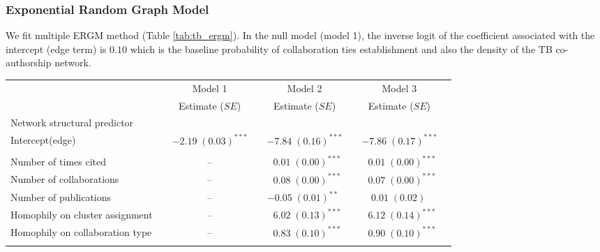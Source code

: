 \subsubsection{Exponential Random Graph Model}
\label{sec:tb_results_ergm}
We fit multiple ERGM method (Table \ref{tab:tb_ergm}). In the null model (model 1), the inverse logit of the coefficient associated with the intercept (edge term) is $0.10$ which is the baseline probability of collaboration ties establishment and also the density of the TB co-authorship network.

\begin{table}
\begin{center}
\hspace*{-1cm}
\small
\begin{tabular}{@{}lcclclcl@{}}
\toprule
           &  & Model 1 &  & Model 2  &  & Model 3\\ \cmidrule{3-3} \cmidrule{5-5} \cmidrule{7-7}            &  & Estimate ($SE$) &  & Estimate ($SE$)  &  & Estimate ($SE$) \\ \midrule
           Network structural predictor &  &   &  &  &  \\
\hspace{10pt}Intercept(edge) & & $-2.19 \; (0.03)^{***}$ & & $-7.84 \; (0.16)^{***}$ & & $-7.86 \; (0.17)^{***}$ \\ \\
Number of times cited        & &       --  & & $\hspace{6pt}0.01 \; (0.00)^{***}$ &  & $\hspace{6pt}0.01 \; (0.00)^{***}$  \\
Number of collaborations     & &  --  & & $\hspace{6pt}0.08 \; (0.00)^{***}$ &  & $\hspace{6pt}0.07 \; (0.00)^{***}$  \\
Number of publications       & &  --  & & $-0.05 \; (0.01)^{**~~}$ &  & $\hspace{6pt}0.01 \; (0.02)^{~~~~}$   \\
Homophily on cluster assignment &  &   --  &  & $\hspace{6pt}6.02 \; (0.13)^{***}$ &  & $\hspace{6pt}6.12 \; (0.14)^{***}$  \\
Homophily on collaboration type   &   & -- &   & $\hspace{6pt}0.83 \; (0.10)^{***}$ &  & $\hspace{6pt}0.90 \; (0.10)^{***}$  \\ \\

\end{tabular}
\end{center}
\end{table}
